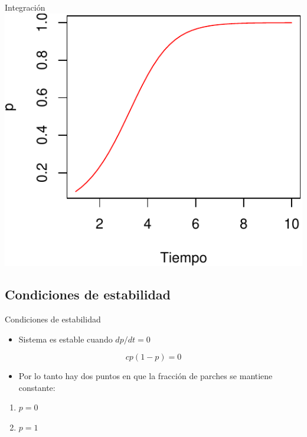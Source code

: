 \documentclass[
  11pt,
  ignorenonframetext,
]{beamer}
\providecommand{\tightlist}{%
  \setlength{\itemsep}{0pt}\setlength{\parskip}{0pt}}
\begin{document}
\begin{frame}{Integración}
\includegraphics{Modelos-meta_files/figure-beamer/unnamed-chunk-7-1.pdf}
\end{frame}

\hypertarget{condiciones-de-estabilidad}{%
\subsection{Condiciones de
estabilidad}\label{condiciones-de-estabilidad}}

\begin{frame}{Condiciones de estabilidad}
\begin{itemize}
\tightlist
\item
  Sistema es estable cuando \(dp/dt = 0\)
\end{itemize}

\[cp(1-p) = 0\]

\begin{itemize}
\tightlist
\item
  Por lo tanto hay dos puntos en que la fracción de parches se mantiene
  constante:
\end{itemize}

\begin{enumerate}
\item
  \(p = 0\)
\item
  \(p = 1\)
\end{enumerate}
\end{frame}
\end{document}
